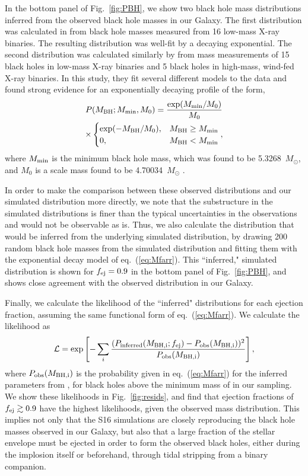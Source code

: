 \documentclass[]{emulateapj}
\newcommand{\Ms}{M_{\odot}}
\newcommand{\Mb}{M_{\rm BH}}
\newcommand{\fe}{f_{\rm ej}}
\begin{document}
In the bottom panel of Fig.~\ref{fig:PBH}, we show two black hole mass distributions inferred from the observed black hole masses in our Galaxy.
The first distribution was calculated in \citet{Ozel2010b} from black hole masses measured from 16 low-mass X-ray binaries. The resulting distribution was well-fit by a decaying exponential. The second distribution was calculated similarly by \citet{Farr2011} from mass measurements of 15 black holes in low-mass X-ray binaries and 5 black holes in high-mass, wind-fed X-ray binaries. In this study, they fit several different models to the data and found strong evidence for an exponentially decaying profile of the form,  
\begin{multline}
P(\Mb; M_{\rm min}, M_0) = \frac{\exp(M_{\rm min} / M_0)}{M_0} \\ \times
   \begin{cases} 
	 \exp(-\Mb/ M_0), & \Mb \ge M_{\rm min}  \\
	 0, & \Mb < M_{\rm min}  
   \end{cases},
\label{eq:Mfarr}
\end{multline}
where $M_{\rm min}$ is the minimum black hole mass, which was found to be 5.3268~$\Ms$, and $M_0$ is a scale mass found to be 4.70034~$\Ms$ \citep{Farr2011}.

In order to make the comparison between these observed distributions and our simulated distribution more directly, we note that the substructure in the simulated distributions is finer than the typical uncertainties in the observations and would not be observable as is. Thus, we also calculate the distribution that would be inferred from the underlying simulated distribution, by drawing 200 random  black hole masses from the simulated distribution and fitting them with the exponential decay model of eq.~(\ref{eq:Mfarr}). This ``inferred," simulated distribution is shown for $\fe=0.9$ in the bottom panel of Fig.~\ref{fig:PBH}, and shows close agreement with the observed distribution in our Galaxy.

Finally, we calculate the likelihood of the ``inferred" distributions for each ejection fraction, assuming the same functional form of eq.~(\ref{eq:Mfarr}). We calculate the likelihood as
\begin{equation}
\mathcal{L} = \exp \left[ - \sum_i \frac{(P_{\rm inferred}(M_{\rm BH,i}; \fe) - P_{\rm obs}(M_{\rm BH,i}))^2}{P_{\rm obs}({M_{\rm BH,i}})} \right],
\label{eq:likelihoods}
\end{equation}
where $P_{\rm obs}(M_{\rm BH,i})$ is the probability given in eq.~(\ref{eq:Mfarr}) for the inferred parameters from \citet{Farr2011}, for black holes above the minimum mass of \citet{Farr2011} in our sampling. We show these likelihoods in Fig.~\ref{fig:resids}, and find that ejection fractions of $\fe \gtrsim 0.9$ have the highest likelihoods, given the observed mass distribution. This implies not only that the S16 simulations are closely reproducing the black hole masses observed in our Galaxy, but also that a large fraction of the stellar envelope must be ejected in order to form the observed black holes, either during the implosion itself or beforehand, through tidal stripping from a binary companion.
\end{document}
